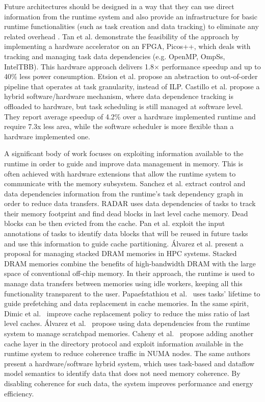 Future architectures should be designed in a way that they can use direct
information from the runtime system and also provide an infrastructure for
basic runtime functionalities (such as task creation and data tracking) to
eliminate any related overhead \cite{JSFI19,Casas2015}. Tan et al.
\cite{7967114} demonstrate the feasibility of the approach by implementing a
hardware accelerator on an FPGA, Picos++, which deals with tracking and
managing task data dependencies (e.g. OpenMP, OmpSs, IntelTBB).  This hardware
approach delivers 1.8$\times$ performance speedup and up to 40\% less power
consumption.  Etsion et al. \cite{etsion:micro2011} propose an abstraction to
out-of-order pipeline that operates at task granularity, instead of ILP.
Castillo et al. \cite{8327016} propose a hybrid software/hardware mechanism, where
data dependence tracking is offloaded to hardware, but task scheduling
is still managed at software level.  They report average speedup of 4.2\% 
over a hardware implemented runtime and require 7.3x less area, while 
the software scheduler is more flexible than a hardware implemented one.    

A significant body of work focuses on exploiting information available to the
runtime in order to guide and improve data management in memory. This is often
achieved with hardware extensions that allow the runtime system to communicate
with the memory subsystem.  Sanchez et al.
\cite{SanchezBarrera:2018:RDM:3205289.3205310} extract control and data
dependencies information from the runtime's task dependency graph in order to
reduce data transfers.  RADAR \cite{Manivannan.2016.HPCA} uses data
dependencies of tasks to track their memory footprint and find dead blocks in
last level cache memory.  Dead blocks can be then evicted from the cache.  Pan
et al. \cite{Pan.2015.SC} exploit the input annotations of tasks to identify
data blocks that will be reused in future tasks and use this information to guide
cache partitioning.  \'Alvarez et al.
\cite{Alvarez:2018:RMS:3205289.3205312} present a proposal for managing stacked
DRAM memories in HPC systems.  Stacked DRAM memories combine the benefits of
high-bandwidth DRAM with the large space of conventional off-chip memory.  In
their approach, the runtime is used to manage data transfers between memories
using idle workers, keeping all this functionality transparent to the user.
Papaefstathiou et al.~\cite{Papaefstathiou.2013.ICS} uses tasks' lifetime to
guide prefetching and data replacement in cache memories.  In the same spirit, Dimic et
al.~\cite{Dimic.2017.Europar} improve cache replacement policy to reduce the
miss ratio of last level caches.  \'Alvarez et al.~\cite{Alvarez.2015.PACT}
propose using data dependencies from the runtime system to manage scratchpad
memories.  Caheny et al.~\cite{Caheny:2016:RCC:2967938.2967962,
Caheny.2018.TPDS} propose adding another cache layer in the directory protocol
and exploit information available in the runtime system to reduce coherence
traffic in NUMA nodes.  The same authors \cite{Caheny:2018:RCC:3291656.3291703}
present a hardware/software hybrid system, which uses task-based and dataflow
model semantics to identify data that does not need memory coherence.  By
disabling coherence for such data, the system improves performance and energy
efficiency.  

